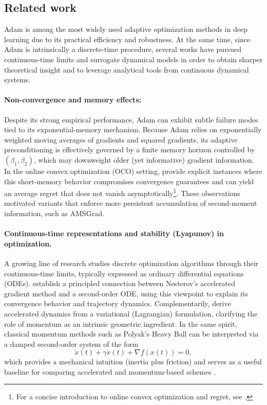 \documentclass{article} %
\begin{document}
\subsection{Related work}
Adam is among the most widely used adaptive optimization methods in deep learning due to its practical efficiency and robustness. At the same time, since Adam is intrinsically a discrete-time procedure, several works have pursued continuous-time limits and surrogate dynamical models in order to obtain sharper theoretical insight and to leverage analytical tools from continuous dynamical systems.

\paragraph{Non-convergence and memory effects:}
Despite its strong empirical performance, Adam can exhibit subtle failure modes tied to its exponential-memory mechanism. Because Adam relies on exponentially weighted moving averages of gradients and squared gradients, its adaptive preconditioning is effectively governed by a finite memory horizon controlled by $(\beta_1,\beta_2)$, which may downweight older (yet informative) gradient information. In the online convex optimization (OCO) setting, \cite{reddi2019convergenceadam} provide explicit instances where this short-memory behavior compromises convergence guarantees and can yield an average regret that does not vanish asymptotically\footnote{For a concise introduction to online convex optimization and regret, see \cite{hazan2023introductiononlineconvexoptimization}.}. These observations motivated variants that enforce more persistent accumulation of second-moment information, such as AMSGrad.

\paragraph{Continuous-time representations and stability (Lyapunov) in optimization.}
A growing line of research studies discrete optimization algorithms through their continuous-time limits, typically expressed as ordinary differential equations (ODEs). \cite{Su2016} establish a principled connection between Nesterov's accelerated gradient method and a second-order
ODE, using this viewpoint to explain its convergence behavior and trajectory dynamics. Complementarily, \cite{wibisono2016} derive accelerated dynamics from a variational (Lagrangian) formulation, clarifying the role of momentum as an intrinsic geometric ingredient. In the same spirit, classical momentum methods such as Polyak's Heavy Ball \cite{polyak1964speedup-Hball} can be interpreted via a damped
second-order system of the form
\begin{equation}
\ddot{x}(t) + \gamma \dot{x}(t) + \nabla f(x(t)) = 0,
\end{equation}
which provides a mechanical intuition (inertia plus friction) and serves as a useful baseline for comparing accelerated and momentum-based schemes \cite{Alvarez2000OnTM, ALVAREZ2002747}.
\end{document}
